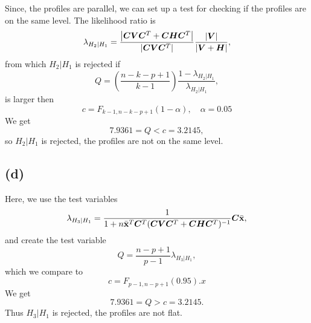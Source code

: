 Since, the profiles are parallel, we can set up a test for checking if
the profiles are on the same level. The likelihood ratio is 
\begin{equation*}
  \lambda_{H_2 | H_1} = \frac{\left| \bm{C}\bm{V} \bm{C}^{T} + \bm{C} \bm{H}\bm{C}^T \right|}{\left| \bm{C}\bm{V} \bm{C}^T \right|}\frac{\left| \bm{V} \right|}{\left| \bm{V}+\bm{H} \right|},
\end{equation*}
from which $H_{2}|H_{1}$ is rejected if 
\begin{equation*}
  Q = \left(\frac{n-k - p +1}{k - 1}\right)\frac{1 - \lambda_{H_2 |H_1}}{\lambda_{H_2 | H_1}},
\end{equation*}
is larger then 
\begin{equation*}
  c = F_{k-1, n - k - p +1} (1 - \alpha), \quad \alpha = 0.05
\end{equation*}
We get
\begin{equation*}
 7.9361  = Q < c = 3.2145,
\end{equation*}
so $H_2 | H_1$ is rejected, the profiles are not on the same level.

\subsection*{(d)}
\label{sec:d-1}

Here, we use the test variables 
\begin{equation*}
  \lambda_{H_3 | H_1} = \frac{1}{1 + n \bar{\bf x}^T \bm{C}^T (\bm{CVC}^T +
    \bm{CHC}^T)^{-1}}\bm{C}\bar{\bf x},
\end{equation*}
and create the test variable
\begin{equation*}
  Q = \frac{n - p +1}{p - 1}\lambda_{H_3 |H_1}, 
\end{equation*}
which we compare to 
\begin{equation*}
  c = F_{p-1, n-p+1}(0.95).x
\end{equation*}
We get
\begin{equation*}
  7.9361 = Q > c = 3.2145.
\end{equation*}
Thus $H_3 | H_1$ is rejected, the profiles are not flat.
